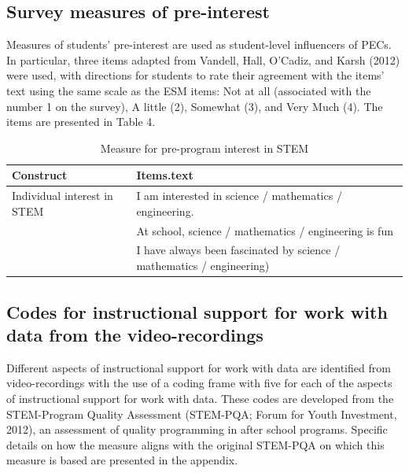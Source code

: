 \documentclass[]{book}
\theoremstyle{definition}
\theoremstyle{definition}
\theoremstyle{definition}
\theoremstyle{remark}
\begin{document}
\subsection{Survey measures of
pre-interest}\label{survey-measures-of-pre-interest}

Measures of students' pre-interest are used as student-level influencers
of PECs. In particular, three items adapted from Vandell, Hall, O'Cadiz,
and Karsh (2012) were used, with directions for students to rate their
agreement with the items' text using the same scale as the ESM items:
Not at all (associated with the number 1 on the survey), A little (2),
Somewhat (3), and Very Much (4). The items are presented in Table 4.

\begin{table}

\caption{\label{tab:unnamed-chunk-6}Measure for pre-program interest in STEM}
\centering
\begin{tabular}[t]{ll}
\toprule
Construct & Items.text\\
\midrule
Individual interest in STEM & I am interested in science / mathematics / engineering.\\
 & At school, science / mathematics / engineering is fun\\
 & I have always been fascinated by science / mathematics / engineering)\\
\bottomrule
\end{tabular}
\end{table}

\subsection{Codes for instructional support for work with data from the
video-recordings}\label{codes-for-instructional-support-for-work-with-data-from-the-video-recordings}

Different aspects of instructional support for work with data are
identified from video-recordings with the use of a coding frame with
five for each of the aspects of instructional support for work with
data. These codes are developed from the STEM-Program Quality Assessment
(STEM-PQA; Forum for Youth Investment, 2012), an assessment of quality
programming in after school programs. Specific details on how the
measure aligns with the original STEM-PQA on which this measure is based
are presented in the appendix.
\end{document}
